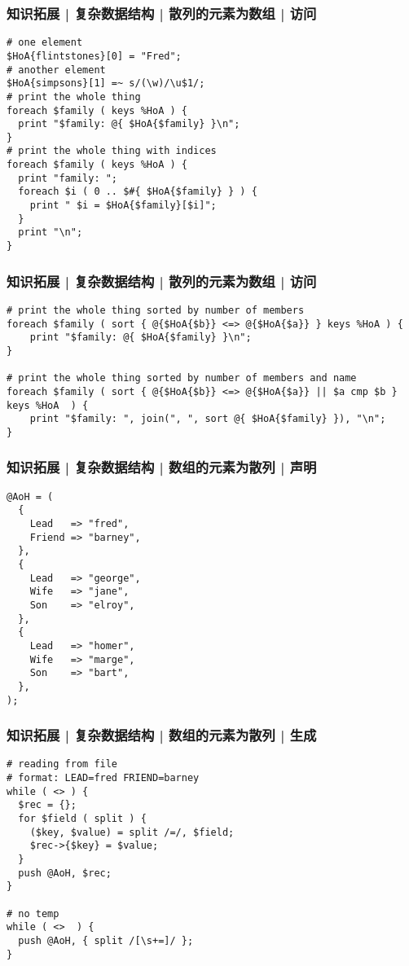 \begin{frame}[fragile]
  \frametitle{知识拓展 | 复杂数据结构 | 散列的元素为数组 | 访问}
\begin{lstlisting}
# one element
$HoA{flintstones}[0] = "Fred";
# another element
$HoA{simpsons}[1] =~ s/(\w)/\u$1/;
# print the whole thing
foreach $family ( keys %HoA ) {
  print "$family: @{ $HoA{$family} }\n";
}
# print the whole thing with indices
foreach $family ( keys %HoA ) {
  print "family: ";
  foreach $i ( 0 .. $#{ $HoA{$family} } ) {
    print " $i = $HoA{$family}[$i]";
  }
  print "\n";
}
\end{lstlisting}
\end{frame}

\begin{frame}[fragile]
  \frametitle{知识拓展 | 复杂数据结构 | 散列的元素为数组 | 访问}
\begin{lstlisting}
# print the whole thing sorted by number of members
foreach $family ( sort { @{$HoA{$b}} <=> @{$HoA{$a}} } keys %HoA ) {
    print "$family: @{ $HoA{$family} }\n";
}

# print the whole thing sorted by number of members and name
foreach $family ( sort { @{$HoA{$b}} <=> @{$HoA{$a}} || $a cmp $b } keys %HoA  ) {
    print "$family: ", join(", ", sort @{ $HoA{$family} }), "\n";
}
\end{lstlisting}
\end{frame}

\begin{frame}[fragile]
  \frametitle{知识拓展 | 复杂数据结构 | 数组的元素为散列 | 声明}
\begin{lstlisting}
@AoH = (
  {
    Lead   => "fred",
    Friend => "barney",
  },
  {
    Lead   => "george",
    Wife   => "jane",
    Son    => "elroy",
  },
  {
    Lead   => "homer",
    Wife   => "marge",
    Son    => "bart",
  },
);
\end{lstlisting}
\end{frame}

\begin{frame}[fragile]
  \frametitle{知识拓展 | 复杂数据结构 | 数组的元素为散列 | 生成}
\begin{lstlisting}
# reading from file
# format: LEAD=fred FRIEND=barney
while ( <> ) {
  $rec = {};
  for $field ( split ) {
    ($key, $value) = split /=/, $field;
    $rec->{$key} = $value;
  }
  push @AoH, $rec;
}

# no temp
while ( <>  ) {
  push @AoH, { split /[\s+=]/ };
}
\end{lstlisting}
\end{frame}

